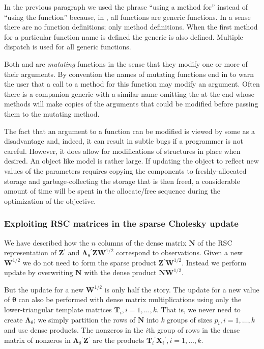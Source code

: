 \documentclass{jss}
\newcommand{\bLt}{\ensuremath{\bm\Lambda_\theta}}
\newcommand{\trans}{\ensuremath{^\prime}}
\begin{document}
In the previous paragraph we used the phrase ``using a method for''
instead of ``using the function'' because, in , all
functions are generic functions.  In a sense there are no function
definitions; only method definitions.  When the first method for a
particular function name is defined the generic is also
defined. Multiple dispatch is used for all generic functions.

Both  and  are \emph{mutating} functions in
the sense that they modify one or more of their arguments.  By
convention the names of mutating functions end in \code{!} to warn the
user that a call to a method for this function may modify an argument.
Often there is a companion generic with a similar name omitting the
\code{!} at the end whose methods will make copies of the arguments
that could be modified before passing them to the mutating method.

The fact that an argument to a  function can be
modified is viewed by some as a disadvantage and, indeed, it can
result in subtle bugs if a programmer is not careful.  However, it
does allow for modifications of structures in place when desired.  An
object like model  is rather large.  If updating the object
to reflect new values of the parameters requires copying the
components to freshly-allocated storage and garbage-collecting the
storage that is then freed, a considerable amount of time will be
spent in the allocate/free sequence during the optimization of the
objective.

\subsubsection{Exploiting RSC matrices in the sparse Cholesky update}
\label{sec:RSCmatChol}

We have described how the $n$ columns of the dense matrix $\bm N$ of
the RSC representation of $\bm Z\trans$ and $\bLt\trans\bm Z\bm
W^{1/2}$ correspond to observations.  Given a new $\bm W^{1/2}$ we do
not need to form the sparse product $\bm Z\trans\bm W^{1/2}$.  Instead
we perform update by overwriting $\bm N$ with the dense product $\bm
N\bm W^{1/2}$.

But the update for a new $\bm W^{1/2}$ is only half the story.  The
update for a new value of $\bm\theta$ can also be performed with dense
matrix multiplications using only the lower-triangular template
matrices $\bm T_i,i=1,\dots,k$.  That is, we never need to create
$\bLt$; we simply partition the rows of $\bm N$ into $k$ groups of
sizes $p_i,i=1,\dots,k$ and use dense products.  The nonzeros in the
$i$th group of rows in the dense matrix of nonzeros in $\bLt\trans\bm
Z\trans$ are the products $\bm T_i\trans\bm X_i\trans,i=1,\dots,k$.
\end{document}
